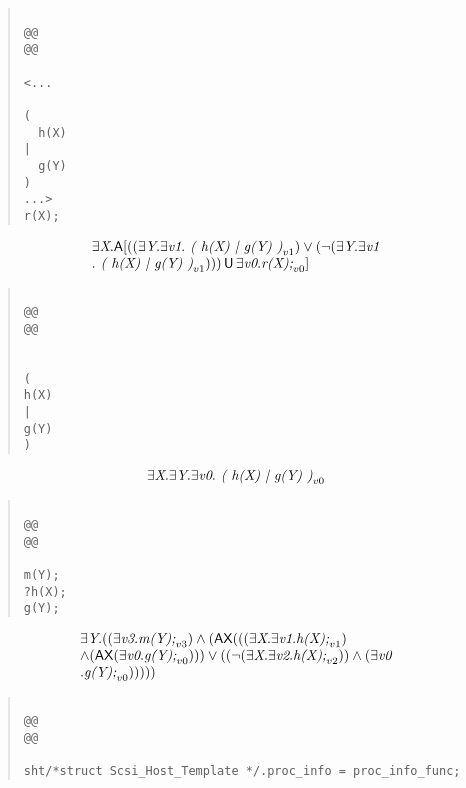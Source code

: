 \documentclass{article}
\newcommand{\U}{\,\mbox{\sf{U}}\,}
\newcommand{\A}{\mbox{\sf{A}}}
\newcommand{\AX}{\mbox{\sf{AX}}}
\newcommand{\mita}[1]{\mbox{\it{{#1}}}}
\begin{document}
\begin{quote}\begin{verbatim}

@@
@@

<...
  
(
  h(X)
|
  g(Y)
)
...>
r(X);
\end{verbatim}\end{quote}

\[\begin{array}{l}
\exists \mita{X} . \A[((\exists \mita{Y} . \exists \mita{v1} . \mita{
(
h(X)
|
g(Y)
)}_{v1}) \vee (\neg (\exists \mita{Y} . \exists \mita{v1}\\ . \mita{
(
h(X)
|
g(Y)
)}_{v1}))) \U \exists \mita{v0} . \mita{r(X);}_{v0}]

\end{array}\]

\begin{quote}\begin{verbatim}

@@
@@


(
h(X)
|
g(Y)
)
\end{verbatim}\end{quote}

\[\begin{array}{l}
\exists \mita{X} . \exists \mita{Y} . \exists \mita{v0} . \mita{
(
h(X)
|
g(Y)
)}_{v0}
\end{array}\]

\begin{quote}\begin{verbatim}

@@
@@

m(Y);
?h(X);
g(Y);
\end{verbatim}\end{quote}

\[\begin{array}{l}
\exists \mita{Y} . ((\exists \mita{v3} . \mita{m(Y);}_{v3}) \wedge (\AX(((\exists \mita{X} . \exists \mita{v1} . \mita{h(X);}_{v1})\\ \wedge (\AX(\exists \mita{v0} . \mita{g(Y);}_{v0}))) \vee ((\neg (\exists \mita{X} . \exists \mita{v2} . \mita{h(X);}_{v2})) \wedge (\exists \mita{v0}\\ . \mita{g(Y);}_{v0})))))
\end{array}\]

\begin{quote}\begin{verbatim}

@@
@@

sht/*struct Scsi_Host_Template */.proc_info = proc_info_func;
\end{verbatim}\end{quote}
\end{document}
